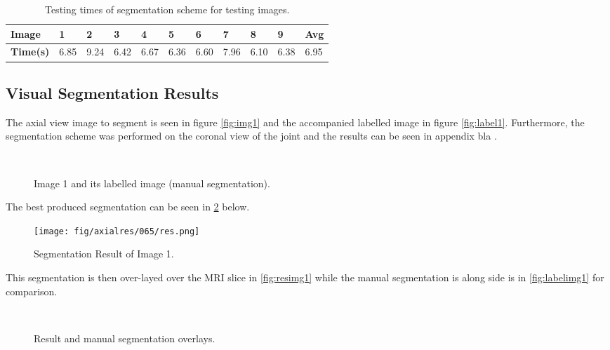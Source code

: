 \begin{table}[H]
\centering
\caption{Testing times of segmentation scheme for testing images.}

\begin{tabular}{|l|l|l|l|l|l|l|l|l|l||l|}
\hline
\textbf{Image}	& \textbf{1} & \textbf{2} & \textbf{3} & \textbf{4} & \textbf{5} &\textbf{6} &\textbf{7} & \textbf{8} &\textbf{9} & \textbf{Avg}\\
\hline
\textbf{Time(s)} & 6.85 & 9.24 & 6.42 & 6.67 & 6.36 & 6.60 & 7.96 & 6.10 & 6.38 & 6.95\\
\hline				    	 			   			    	 
\end{tabular}
\label{table:times}
\end{table}

\subsection{Visual Segmentation Results}
The axial view image to segment is seen in figure \ref{fig:img1} and the accompanied labelled image in figure \ref{fig:label1}. Furthermore, the segmentation scheme was performed on the coronal view of the joint and the results can be seen in appendix bla .

\begin{figure}[H]
    \centering
    \\
    \caption{Image 1 and its labelled image (manual segmentation).}%
    \label{fig:image1}
\end{figure}

The best produced segmentation can be seen in \ref{fig:res1} below.

\begin{figure}[H]
\centering
\texttt{[image: fig/axialres/065/res.png]}
\caption{Segmentation Result of Image 1.}
\label{fig:res1}
\end{figure}

This segmentation is then over-layed over the MRI slice in \ref{fig:resimg1} while the manual segmentation is along side is in \ref{fig:labelimg1} for comparison. 

\begin{figure}[H]
    \centering
    \\
    \caption{Result and manual segmentation overlays.}%
    \label{fig:overlay1}
\end{figure}

